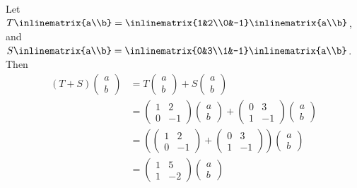 \begin{exm}\label{exm-linear-maps-operations}
	Let $T\inlinematrix{a\\b}=\inlinematrix{1&2\\0&-1}\inlinematrix{a\\b}$,
	and $S\inlinematrix{a\\b}=\inlinematrix{0&3\\1&-1}\inlinematrix{a\\b}$. Then
	\begin{align*}
		(T+S)\begin{pmatrix}
			a \\ b
		\end{pmatrix} & =T\begin{pmatrix}
			a \\ b
		\end{pmatrix}+S\begin{pmatrix}
			a \\ b
		\end{pmatrix}                                                     \\
		                                 & =\begin{pmatrix}
			1 & 2  \\
			0 & -1
		\end{pmatrix}\begin{pmatrix}
			a \\ b
		\end{pmatrix}+\begin{pmatrix}
			0 & 3  \\
			1 & -1
		\end{pmatrix}\begin{pmatrix}
			a \\ b
		\end{pmatrix} \\
		                                 & =\left(
		\begin{pmatrix}
			1 & 2  \\
			0 & -1
		\end{pmatrix}+
		\begin{pmatrix}
			0 & 3  \\
			1 & -1
		\end{pmatrix}
		\right)\begin{pmatrix}
			a \\ b
		\end{pmatrix}                                                                                                                \\
		                                 & =\begin{pmatrix}
			1 & 5  \\
			1 & -2
		\end{pmatrix}\begin{pmatrix}
			a \\ b
		\end{pmatrix}
	\end{align*}
\end{exm}


